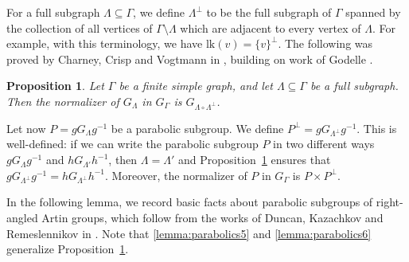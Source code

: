 \documentclass[JEP,XML,SOM,Unicode,NoFloatCountersInSection,published]{cedram}
\theoremstyle{plain}
\newtheorem{prop}[theo]{Proposition}
\theoremstyle{definition}
\newcommand{\lk}{\mathrm{lk}}
\begin{document}
For a full subgraph $\Lambda\subseteq \Gamma$, we define $\Lambda^{\perp}$ to be the full subgraph of $\Gamma$ spanned by the collection of all vertices of $\Gamma\setminus \Lambda$ which are adjacent to every vertex of $\Lambda$. For example, with this terminology, we have $\lk(v)=\{v\}^\perp$. The following was proved by Charney, Crisp and Vogtmann in \cite[Prop.\,2.2]{charney2007automorphisms}, building on work of Godelle \cite{God}.

\begin{prop}\label{prop:normalizer}
Let $\Gamma$ be a finite simple graph, and let $\Lambda\subseteq\Gamma$ be a full subgraph. Then the normalizer of $G_{\Lambda}$ in $G_{\Gamma}$ is $G_{\Lambda\circ \Lambda^{\perp}}$.
\end{prop}

Let now $P=gG_{\Lambda}g^{-1}$ be a parabolic subgroup. We define $P^\perp=gG_{\Lambda^\perp}g^{-1}$. This is well-defined: if we can write the parabolic subgroup $P$ in two different ways $gG_{\Lambda}g^{-1}$ and $hG_{\Lambda'}h^{-1}$, then $\Lambda=\Lambda'$ and Proposition~\ref{prop:normalizer} ensures that $gG_{\Lambda^\perp}g^{-1}=hG_{\Lambda^\perp}h^{-1}$. Moreover, the normalizer of $P$ in $G_{\Gamma}$ is $P\times P^\perp$.

In the following lemma, we record basic facts about parabolic subgroups of right-angled Artin groups, which follow from the works of Duncan, Kazachkov and Remeslennikov in \cite[\S 2.2]{duncan2007parabolic}. Note that \eqref{lemma:parabolics5} and \eqref{lemma:parabolics6} generalize Proposition~\ref{prop:normalizer}.
\end{document}
